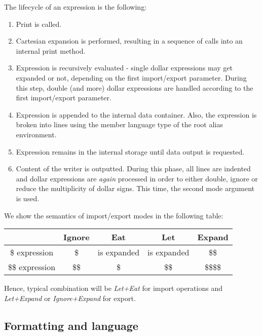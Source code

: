 The lifecycle of an expression is the following:
\begin{enumerate}
  \item Print is called.
  \item Cartesian expansion is performed, resulting in a sequence of calls into an internal print method.
  \item Expression is recursively evaluated - single dollar expressions may get expanded or not, depending on the first import/export parameter. During this step, double (and more) dollar expressions are handled according to the first import/export parameter. 
  \item Expression is appended to the internal data container. Also, the expression is broken into lines using the member language type of the root alias environment.
  \item Expression remains in the internal storage until data output is requested.
  \item Content of the writer is outputted. During this phase, all lines are indented and dollar expressions are \emph{again} processed in order to either double, ignore or reduce the multiplicity of dollar signs. This time, the second mode argument is used.
\end{enumerate}

We show the semantics of import/export modes in the following table:

\mybeginfig
\begin{center}
\begin{tabular}{c|c|c|c|c}
                  & Ignore & Eat          & Let          & Expand    \\
  \hline
  \$ expression   & \$     & is expanded  & is expanded  & \$\$      \\
  \hline
  \$\$ expression & \$\$   & \$           & \$\$         & \$\$\$\$  \\
\end{tabular}
\end{center}

  Hence, typical combination will be \emph{Let+Eat} for import operations and \emph{Let+Expand} or \emph{Ignore+Expand} for export. 

\subsection*{Formatting and language}

